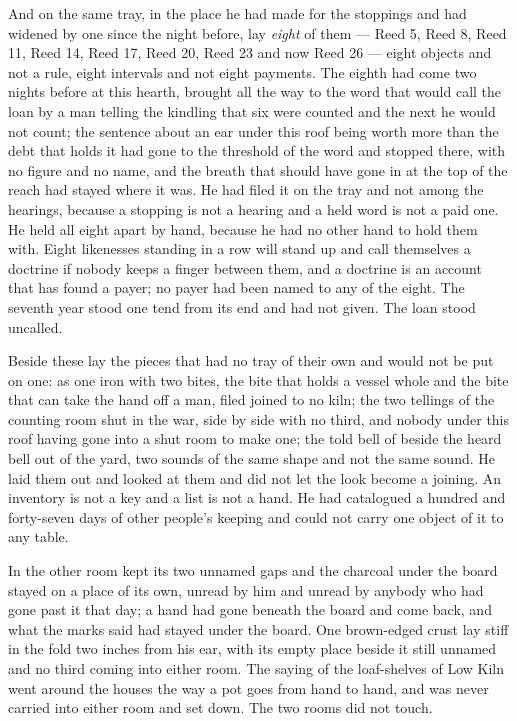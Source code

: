 And on the same tray, in the place he had made for the stoppings and had widened by one since the night before, lay \emph{eight} of them --- Reed 5, Reed 8, Reed 11, Reed 14, Reed 17, Reed 20, Reed 23 and now Reed 26 --- eight objects and not a rule, eight intervals and not eight payments. The eighth had come two nights before at this hearth, brought all the way to the word that would call the loan by a man telling the kindling that six were counted and the next he would not count; the sentence about an ear under this roof being worth more than the debt that holds it had gone to the threshold of the word and stopped there, with no figure and no name, and the breath that should have gone in at the top of the reach had stayed where it was. He had filed it on the tray and not among the hearings, because a stopping is not a hearing and a held word is not a paid one. He held all eight apart by hand, because he had no other hand to hold them with. Eight likenesses standing in a row will stand up and call themselves a doctrine if nobody keeps a finger between them, and a doctrine is an account that has found a payer; no payer had been named to any of the eight. The seventh year stood one tend from its end and had not given. The loan stood uncalled.

Beside these lay the pieces that had no tray of their own and would not be put on one:  as one iron with two bites, the bite that holds a vessel whole and the bite that can take the hand off a man, filed joined to no kiln; the two tellings of the counting room shut in the war, side by side with no third, and nobody under this roof having gone into a shut room to make one; the told bell of  beside the heard bell out of the yard, two sounds of the same shape and not the same sound. He laid them out and looked at them and did not let the look become a joining. An inventory is not a key and a list is not a hand. He had catalogued a hundred and forty-seven days of other people's keeping and could not carry one object of it to any table.

\scenebreak

In the other room  kept its two unnamed gaps and the charcoal under the board stayed on a place of its own, unread by him and unread by anybody who had gone past it that day; a hand had gone beneath the board and come back, and what the marks said had stayed under the board. One brown-edged crust lay stiff in the fold two inches from his ear, with its empty place beside it still unnamed and no third coming into either room. The saying of the loaf-shelves of Low Kiln went around the houses the way a pot goes from hand to hand, and was never carried into either room and set down. The two rooms did not touch.

